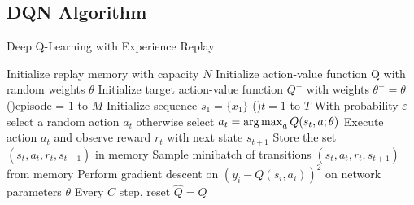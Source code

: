 \begin{appendices}
    \section{DQN Algorithm}\label{app:dqn}
    \begin{algorithm}[h]
        \caption{Deep Q-Learning with Experience Replay~\autocite{Mnih2015}}\label{algo:dqn}
        \SetAlgoLined{}
        Initialize replay memory with capacity \(N\)\;
        Initialize action-value function Q with random weights \(\theta \)\;
        Initialize target action-value function \(Q^-\) with weights \(\theta^{-} = \theta \)\;
        \For(){episode = \(1\) to \(M\)}{
            Initialize sequence \(s_1 = \{x_1\} \)\;
            \For(){\(t=1\) to \(T\)}{
                With probability \(\varepsilon \) select a random action \(a_t\)\;
                otherwise select \(a_t = \operatorname*{arg\,max}_a Q(s_t, a; \theta)\)\;
                Execute action \(a_t\) and observe reward \(r_t\) with next state \(s_{t+1}\)\;
                Store the set \((s_t, a_t, r_t, s_{t+1})\) in memory\;
                Sample minibatch of transitions \((s_t, a_t, r_t, s_{t+1})\) from memory\;
                Perform gradient descent on \((y_i - Q(s_i, a_i))^2\) on network parameters \(\theta \)\;
                Every \(C\) step, reset \(\hat{Q} = Q\)\;
            }
        }
    \end{algorithm}

    \clearpage

\end{appendices}
